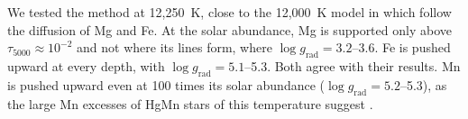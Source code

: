 \documentclass[final,5p]{elsarticle}
\begin{document}
We tested the method at 12{,}250~K, close to the 12{,}000~K model in which \citet{AlecianStift2019} follow the diffusion of Mg and Fe. At the solar abundance, Mg is supported only above $\tau_{5000} \approx 10^{-2}$ and not where its lines form, where $\log g_\mathrm{rad} = 3.2$--3.6. Fe is pushed upward at every depth, with $\log g_\mathrm{rad} = 5.1$--5.3. Both agree with their results. Mn is pushed upward even at 100 times its solar abundance ($\log g_\mathrm{rad} = 5.2$--5.3), as the large Mn excesses of HgMn stars of this temperature suggest \citep{SmithDworetsky1993}.

\begin{table}
\centering
\caption{Radiative acceleration on Tc relative to gravity, $\log(g_\mathrm{rad}/g)$, in ATLAS9 models with $\log g = 4$, at the depth between $\tau_{5000} = 10^{-4}$ and 3 where it is smallest. $\log\epsilon_\mathrm{Tc}$ is the threshold of the  ultraviolet beacon (2.4~m space echelle, $S/N = 300$) for a star rotating at $v\sin i = 10$~km~s$^{-1}$. Unsaturated: each line in the continuum flux at the threshold abundance. Threshold and $100\times$ threshold: every line solved in its own window at those abundances.}
\label{tab:levitation}
\footnotesize
\setlength{\tabcolsep}{4pt}

\end{table}
\end{document}
